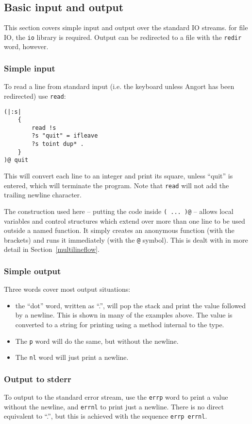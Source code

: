\subsection{Basic input and output}
This section covers simple input and output over the standard IO streams.
for file IO, the \texttt{io} library is required. Output can be redirected
to a file with the \texttt{redir} word, however.

\subsubsection{Simple input}
To read a line from standard input (i.e. the keyboard unless Angort
has been redirected) use \texttt{read}:
\begin{lstlisting}
(|:s|
    {
        read !s
        ?s "quit" = ifleave
        ?s toint dup* .
    }
)@ quit
\end{lstlisting}
This will convert each line to an integer and print its square,
unless ``quit'' is entered, which will terminate the program.
Note that \texttt{read} will not add the trailing newline character.

The construction used here -- putting the code inside \texttt{( ... )@} --
allows local variables and control structures which extend over more than one line to
be used outside a named function. It simply creates an anonymous
function (with the brackets) and runs it immediately (with the \texttt{@} 
symbol). This is dealt with in more detail in Section~\ref{multilineflow}.

\subsubsection{Simple output}
Three words cover most output situations:
\begin{itemize}
\item the ``dot'' word, written as ``.'', will pop the stack and print
the value followed by a newline. This is shown in many of the examples
above. The value is converted to a string for printing using a method
internal to the type.
\item The \texttt{p} word will do the same, but without the newline.
\item The \texttt{nl} word will just print a newline.
\end{itemize}

\subsubsection{Output to stderr}
To output to the standard error stream, use the \texttt{errp} word
to print a value without the newline, and \texttt{errnl} to print just
a newline. There is no direct equivalent to ``.'', but this is achieved
with the sequence \texttt{errp errnl}.


